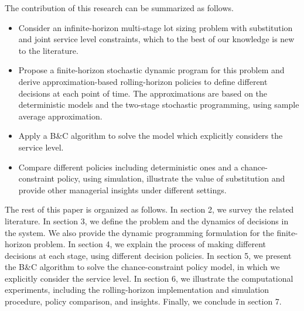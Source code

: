 \documentclass[11pt]{article}
\begin{document}
The contribution of this research can be summarized as follows. 
\begin{itemize}
\item Consider an infinite-horizon multi-stage lot sizing problem with substitution and joint service level constraints, which to the best of our knowledge is new to the literature.

\item Propose a finite-horizon stochastic dynamic program for this problem and derive approximation-based rolling-horizon policies to define different decisions at each point of time. The approximations are based on the deterministic models and the two-stage stochastic programming, using sample average approximation.

\item Apply a B\&C algorithm to solve the model which explicitly considers the service level.

\item Compare different policies including deterministic ones and a chance-constraint policy, using simulation, illustrate the value of substitution and provide other managerial insights under different settings.%
    


\end{itemize}

The rest of this paper is organized as follows. In section 2, we survey the related literature. In section 3, we define the problem and the dynamics of decisions in the system. We also provide the dynamic programming formulation for the finite-horizon problem. In section 4, we explain the process of making different decisions at each stage, using different decision policies.  In section 5, we present the B\&C algorithm to solve the chance-constraint policy model, in which we explicitly consider the service level. In section 6, we illustrate the computational experiments, including the rolling-horizon implementation and simulation procedure, policy comparison, and insights. Finally, we conclude in section 7.
\end{document}
